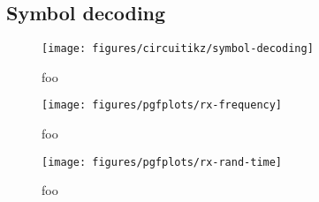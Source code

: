 
\FloatBarrier
\subsection{Symbol decoding}

\begin{figure}[htb]
	\centering
	\texttt{[image: figures/circuitikz/symbol-decoding]}
	\caption{foo}
\end{figure}

\begin{figure}[htb]
	\centering
	\texttt{[image: figures/pgfplots/rx-frequency]}
	\caption{foo}
\end{figure}

\begin{figure}[htb]
	\centering
	\texttt{[image: figures/pgfplots/rx-rand-time]}
	\caption{foo}
\end{figure}